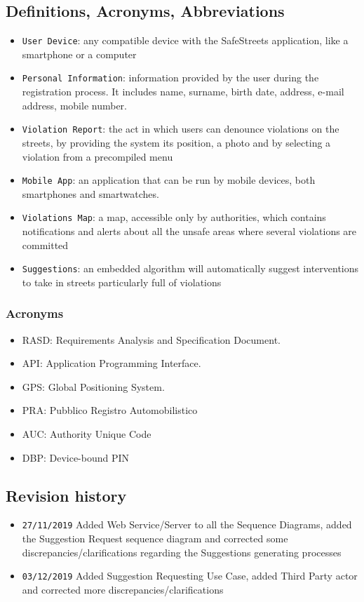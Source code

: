 \documentclass[12pt,a4paper]{article}
\begin{document}
\subsection{Definitions, Acronyms, Abbreviations}
			\begin{itemize}
				\item \texttt{User Device}: any compatible device with the SafeStreets application, like a smartphone or a computer
				\item \texttt{Personal Information}: information provided by the user during the registration process. It includes name, surname, birth date, address, e-mail address, mobile number.
				\item \texttt{Violation Report}: the act in which users can denounce violations on the streets, by providing the system its position, a photo and by selecting a violation from a precompiled menu
				\item \texttt{Mobile App}: an application that can be run by mobile devices, both smartphones and smartwatches.
				\item \texttt{Violations Map}: a map, accessible only by authorities, which contains notifications and alerts about all the unsafe areas where several violations are committed
				\item \texttt{Suggestions}: an embedded algorithm will automatically suggest interventions to take in streets particularly full of violations
			\end{itemize}
		\subsubsection{Acronyms}
			\begin{itemize}
				\item RASD: Requirements Analysis and Specification Document.
				\item API: Application Programming Interface.
				\item GPS: Global Positioning System.
				\item PRA: Pubblico Registro Automobilistico
				\item AUC: Authority Unique Code
				\item DBP: Device-bound PIN
			\end{itemize}
\subsection{Revision history}
\begin{itemize}
\item \texttt{27/11/2019} Added Web Service/Server to all the Sequence Diagrams, added the Suggestion Request sequence diagram and corrected some discrepancies/clarifications regarding the Suggestions generating processes
\item \texttt{03/12/2019} Added Suggestion Requesting Use Case, added Third Party actor and corrected more discrepancies/clarifications
\end{itemize}
\newpage
\end{document}
